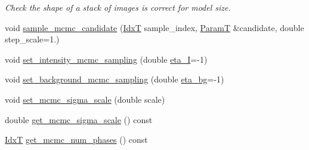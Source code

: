 \begin{DoxyCompactItemize}
\begin{DoxyCompactList}\small\item\em Check the shape of a stack of images is correct for model size. \end{DoxyCompactList}\item 
void \hyperlink{classmappel_1_1MCMCAdaptor1D_a009fcf597dbc4a97d234d6948a4a42ec}{sample\+\_\+mcmc\+\_\+candidate} (\hyperlink{namespacemappel_ab17ec0f30b61ece292439d7ece81d3a8}{IdxT} sample\+\_\+index, \hyperlink{classmappel_1_1PointEmitterModel_a665ec6aea3aac139bb69a23c06d4b9a1}{ParamT} \&candidate, double step\+\_\+scale=1.)
\item 
void \hyperlink{classmappel_1_1MCMCAdaptor1D_ac70f768928859b1e9449b0ec1a141c4c}{set\+\_\+intensity\+\_\+mcmc\+\_\+sampling} (double \hyperlink{classmappel_1_1MCMCAdaptor1D_a5780d326be0c40e10d6c91777cfffbd3}{eta\+\_\+I}=-\/1)
\item 
void \hyperlink{classmappel_1_1MCMCAdaptor1D_ae79ee3845fbdd0e378f00eeebf8ccef1}{set\+\_\+background\+\_\+mcmc\+\_\+sampling} (double \hyperlink{classmappel_1_1MCMCAdaptor1D_af54c93421b8e298289cbb92743c6b3d5}{eta\+\_\+bg}=-\/1)
\item 
void \hyperlink{classmappel_1_1MCMCAdaptorBase_aa6b8eea136bf1f34f0c50bf8d1937a58}{set\+\_\+mcmc\+\_\+sigma\+\_\+scale} (double scale)
\item 
double \hyperlink{classmappel_1_1MCMCAdaptorBase_a9de5ee52bbf5c8fd3c1e3bd00836801a}{get\+\_\+mcmc\+\_\+sigma\+\_\+scale} () const 
\item 
\hyperlink{namespacemappel_ab17ec0f30b61ece292439d7ece81d3a8}{IdxT} \hyperlink{classmappel_1_1MCMCAdaptorBase_adb9997f1dc774f3a169c61cdb730a85f}{get\+\_\+mcmc\+\_\+num\+\_\+phases} () const 
\end{DoxyCompactItemize}
